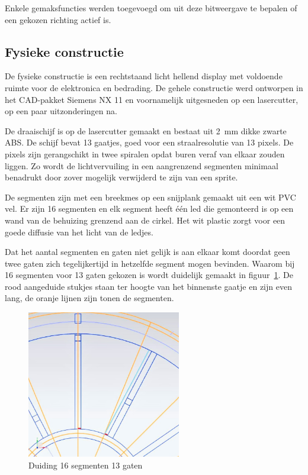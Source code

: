 \documentclass[12pt]{ugentreport}
\begin{document}
Enkele gemaksfuncties werden toegevoegd om uit deze bitweergave te bepalen of
een gekozen richting actief is.

\subsection{Fysieke constructie}
De fysieke constructie is een rechtstaand licht hellend display met voldoende
ruimte voor de elektronica en bedrading. De gehele constructie werd ontworpen
in het CAD-pakket Siemens NX 11 en voornamelijk uitgesneden op een lasercutter,
op een paar uitzonderingen na.

De draaischijf is op de lasercutter gemaakt en bestaat uit \SI{2}{\milli\meter} dikke zwarte ABS.
De schijf bevat 13 gaatjes, goed voor een straalresolutie van 13 pixels. De pixels
zijn gerangschikt in twee spiralen opdat buren veraf van elkaar zouden liggen. Zo
wordt de lichtvervuiling in een aangrenzend segmenten minimaal benadrukt door
zover mogelijk verwijderd te zijn van een sprite.

De segmenten zijn met een breekmes op een snijplank gemaakt uit een wit PVC vel.
Er zijn 16 segmenten en elk segment heeft één led die gemonteerd is op een wand
van de behuizing grenzend aan de cirkel. Het wit plastic zorgt voor een goede
diffusie van het licht van de ledjes.

Dat het aantal segmenten en gaten niet gelijk is aan elkaar komt doordat geen
twee gaten zich tegelijkertijd in hetzelfde segment mogen bevinden. Waarom bij
16 segmenten voor 13 gaten gekozen is wordt duidelijk gemaakt in figuur~\ref{fig:duiding1316}. De
rood aangeduide stukjes staan ter hoogte van het binnenste gaatje en zijn even
lang, de oranje lijnen zijn tonen de segmenten.

\begin{figure}
  \centering
  \includegraphics[width=0.6\textwidth]{img/16vs13.jpg}
  \caption{Duiding 16 segmenten 13 gaten}
  \label{fig:duiding1316}
\end{figure}
\end{document}
